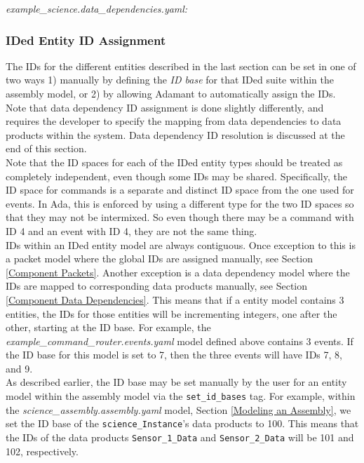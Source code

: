 \textit{example\_science.data\_dependencies.yaml:}

\subsubsection{IDed Entity ID Assignment}

The IDs for the different entities described in the last section can be set in one of two ways 1) manually by defining the \textit{ID base} for that IDed suite within the assembly model, or 2) by allowing Adamant to automatically assign the IDs. Note that data dependency ID assignment is done slightly differently, and requires the developer to specify the mapping from data dependencies to data products within the system. Data dependency ID resolution is discussed at the end of this section. \\

Note that the ID spaces for each of the IDed entity types should be treated as completely independent, even though some IDs may be shared. Specifically, the ID space for commands is a separate and distinct ID space from the one used for events. In Ada, this is enforced by using a different type for the two ID spaces so that they may not be intermixed. So even though there may be a command with ID 4 and an event with ID 4, they are not the same thing. \\

IDs within an IDed entity model are always contiguous. Once exception to this is a packet model where the global IDs are assigned manually, see Section \ref{Component Packets}. Another exception is a data dependency model where the IDs are mapped to corresponding data products manually, see Section \ref{Component Data Dependencies}. This means that if a entity model contains 3 entities, the IDs for those entities will be incrementing integers, one after the other, starting at the ID base. For example, the \textit{example\_command\_router.events.yaml} model defined above contains 3 events. If the ID base for this model is set to 7, then the three events will have IDs 7, 8, and 9. \\

As described earlier, the ID base may be set manually by the user for an entity model within the assembly model via the \texttt{set\_id\_bases} tag. For example, within the \textit{science\_assembly.assembly.yaml} model, Section \ref{Modeling an Assembly}, we set the ID base of the \texttt{science\_Instance}'s data products to 100. This means that the IDs of the data products \texttt{Sensor\_1\_Data} and \texttt{Sensor\_2\_Data} will be 101 and 102, respectively. \\

